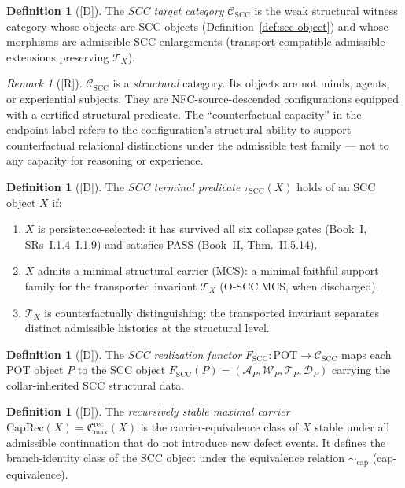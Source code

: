 \documentclass[12pt,oneside]{amsbook}
\theoremstyle{plain}
\theoremstyle{definition}
\newtheorem{definition}[theorem]{Definition}
\theoremstyle{remark}
\newtheorem{remark}[theorem]{Remark}
\newcommand{\status}[1]{\textup{[#1]}}
\newcommand{\scap}{\sim_{\mathrm{cap}}}
\begin{document}
\begin{definition}[\status{D}]\label{def:scc-target-cat}
The \emph{SCC target category} $\mathcal{C}_{\mathrm{SCC}}$
is the weak structural witness category whose objects are SCC
objects (Definition~\ref{def:scc-object}) and whose morphisms
are admissible SCC enlargements (transport-compatible admissible
extensions preserving $\mathcal{T}_X$).
\end{definition}

\begin{remark}[\status{R}]
$\mathcal{C}_{\mathrm{SCC}}$ is a \emph{structural} category.
Its objects are not minds, agents, or experiential subjects.
They are NFC-source-descended configurations equipped with a
certified structural predicate. The ``counterfactual capacity''
in the endpoint label refers to the configuration's structural
ability to support counterfactual relational distinctions under
the admissible test family --- not to any capacity for reasoning
or experience.
\end{remark}

\begin{definition}[\status{D}]\label{def:scc-terminal}
The \emph{SCC terminal predicate} $\tau_{\mathrm{SCC}}(X)$ holds
of an SCC object $X$ if:
\begin{enumerate}[label=\textup{(\arabic*)}]
 \item $X$ is persistence-selected: it has survived all six
 collapse gates (Book~I, SRs~I.1.4--I.1.9) and satisfies
 PASS (Book~II, Thm.~II.5.14).
 \item $X$ admits a minimal structural carrier (MCS): a minimal
 faithful support family for the transported invariant
 $\mathcal{T}_X$ (O-SCC.MCS, when discharged).
 \item $\mathcal{T}_X$ is counterfactually distinguishing: the
 transported invariant separates distinct admissible
 histories at the structural level.
\end{enumerate}
\end{definition}

\begin{definition}[\status{D}]\label{def:scc-functor}
The \emph{SCC realization functor}
$F_{\mathrm{SCC}} : \mathrm{POT} \to \mathcal{C}_{\mathrm{SCC}}$
maps each POT object $P$ to the SCC object
$F_{\mathrm{SCC}}(P) = (\mathcal{A}_P, \mathcal{W}_P,
\mathcal{T}_P, \mathcal{D}_P)$ carrying the collar-inherited
SCC structural data.
\end{definition}

\begin{definition}[\status{D}]\label{def:caprec}
The \emph{recursively stable maximal carrier}
$\mathrm{CapRec}(X) = \mathfrak{C}^{\mathrm{rec}}_{\max}(X)$
is the carrier-equivalence class of $X$ stable under all
admissible continuation that do not introduce new defect events.
It defines the branch-identity class of the SCC object under
the equivalence relation $\scap$ (cap-equivalence).
\end{definition}
\end{document}
